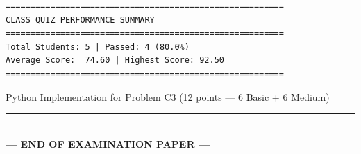 \documentclass[11pt,a4paper]{article}
\begin{document}
\begin{lstlisting}[basicstyle=\ttfamily\scriptsize]
========================================================
CLASS QUIZ PERFORMANCE SUMMARY
========================================================
Total Students: 5 | Passed: 4 (80.0%)
Average Score:  74.60 | Highest Score: 92.50
========================================================
\end{lstlisting}

\begin{answerbox}[height=9.8cm]{Python Implementation for Problem C3 (12 points --- 6 Basic + 6 Medium)}
\end{answerbox}

\vfill
\begin{center}
  \rule{0.5\textwidth}{0.4pt}\\[0.8mm]
  \textbf{\color{primaryblue}--- END OF EXAMINATION PAPER ---}
\end{center}
\end{document}
